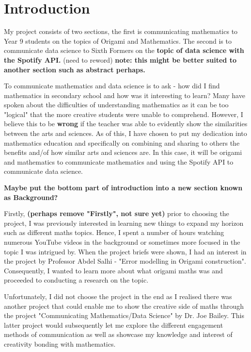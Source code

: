\documentclass[12pt, a4paper,oneside]{book}
\numberwithin{equation}{section}
\begin{document}
\tableofcontents

\chapter{Introduction}\label{ch:1}
My project consists of two sections, the first is communicating mathematics to Year 9 students on the topics of Origami and Mathematics. The second is to communicate data science to Sixth Formers on the {\color{red}\textbf{topic of data science with the Spotify API.}} (need to reword) {\color{blue}\textbf{note: this might be better suited to another section such as abstract perhaps.}}

To communicate mathematics and data science is to ask - how did I find mathematics in secondary school and how was it interesting to learn? Many have spoken about the difficulties of understanding mathematics as it can be too "logical" that the more creative students were unable to comprehend. However, I believe this to be {\color{red}\textbf{wrong}} if the teacher was able to evidently show the similarities between the arts and sciences. As of this, I have chosen to put my dedication into mathematics education and specifically on combining and sharing to others the benefits and/of how similar arts and sciences are. In this case, it will be origami and mathematics to communicate mathematics and using the Spotify API to communicate data science.

{\color{blue}\textbf{Maybe put the bottom part of introduction into a new section known as Background?}}

Firstly, {\color{red}\textbf{(perhaps remove "Firstly", not sure yet)}} prior to choosing the project, I was previously interested in learning new things to expand my horizon such as different maths topics. Hence, I spent a number of hours watching numerous YouTube videos in the background or sometimes more focused in the topic I was intrigued by. When the project briefs were shown, I had an interest in the project by Professor Abdel Salhi - "Error modelling in Origami construction". Consequently, I wanted to learn more about what origami maths was and proceeded to conducting a research on the topic.

Unfortunately, I did not choose the project in the end as I realised there was another project that could enable me to show the creative side of maths through the project "Communicating Mathematics/Data Science" by Dr. Joe Bailey. This latter project would subsequently let me explore the different engagement methods of communication as well as showcase my knowledge and interest of creativity bonding with mathematics.
\end{document}
